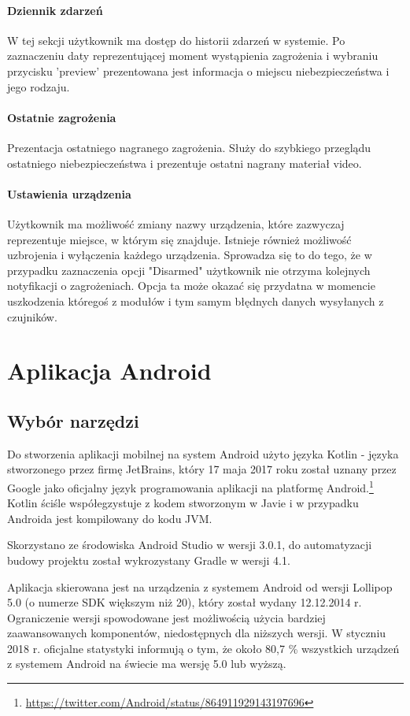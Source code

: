 \paragraph{Dziennik zdarzeń}
W tej sekcji użytkownik ma dostęp do historii zdarzeń w systemie. Po zaznaczeniu daty reprezentującej moment wystąpienia zagrożenia i wybraniu przycisku 'preview' prezentowana jest informacja o miejscu niebezpieczeństwa i jego rodzaju. 

\paragraph{Ostatnie zagrożenia}
Prezentacja ostatniego nagranego zagrożenia. Służy do szybkiego przeglądu ostatniego niebezpieczeństwa i prezentuje ostatni nagrany materiał video. 

\paragraph{Ustawienia urządzenia}
Użytkownik ma możliwość zmiany nazwy urządzenia, które zazwyczaj reprezentuje miejsce, w którym się znajduje. Istnieje również możliwość uzbrojenia i wyłączenia każdego urządzenia. Sprowadza się to do tego, że w przypadku zaznaczenia opcji "Disarmed"  użytkownik nie otrzyma kolejnych notyfikacji o zagrożeniach. Opcja ta może okazać się przydatna w momencie uszkodzenia któregoś z modułów i tym samym błędnych danych wysyłanych z czujników.

\section{Aplikacja Android}
\subsection*{Wybór narzędzi}
Do stworzenia aplikacji mobilnej na system Android użyto języka Kotlin - języka stworzonego przez firmę JetBrains, który 17 maja 2017 roku został uznany przez Google jako oficjalny język programowania aplikacji na platformę Android.\footnote{\url{https://twitter.com/Android/status/864911929143197696}}
Kotlin ściśle współegzystuje z kodem stworzonym w Javie i w przypadku Androida jest kompilowany do kodu JVM.

Skorzystano ze środowiska Android Studio w wersji 3.0.1, do automatyzacji budowy projektu został wykrozystany Gradle w wersji 4.1.

Aplikacja skierowana jest na urządzenia z systemem Android od wersji Lollipop 5.0 (o numerze SDK większym niż 20), który został wydany 12.12.2014 r. Ograniczenie wersji spowodowane jest możliwością użycia bardziej zaawansowanych komponentów, niedostępnych dla niższych wersji. W styczniu 2018 r. oficjalne statystyki informują o tym, że około 80,7 \% wszystkich urządzeń z systemem Android na świecie ma wersję 5.0 lub wyższą.

